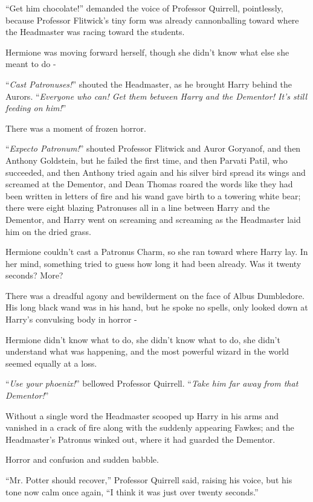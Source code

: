 ``Get him chocolate!'' demanded the voice of Professor Quirrell, pointlessly, because Professor Flitwick's tiny form was already cannonballing toward where the Headmaster was racing toward the students.

Hermione was moving forward herself, though she didn't know what else she meant to do -

``\emph{Cast Patronuses!}'' shouted the Headmaster, as he brought Harry behind the Aurors. ``\emph{Everyone who can! Get them between Harry and the Dementor! It's still feeding on him!}''

There was a moment of frozen horror.

``\emph{Expecto Patronum!}'' shouted Professor Flitwick and Auror Goryanof, and then Anthony Goldstein, but he failed the first time, and then Parvati Patil, who succeeded, and then Anthony tried again and his silver bird spread its wings and screamed at the Dementor, and Dean Thomas roared the words like they had been written in letters of fire and his wand gave birth to a towering white bear; there were eight blazing Patronuses all in a line between Harry and the Dementor, and Harry went on screaming and screaming as the Headmaster laid him on the dried grass.

Hermione couldn't cast a Patronus Charm, so she ran toward where Harry lay. In her mind, something tried to guess how long it had been already. Was it twenty seconds? More?

There was a dreadful agony and bewilderment on the face of Albus Dumbledore. His long black wand was in his hand, but he spoke no spells, only looked down at Harry's convulsing body in horror -

Hermione didn't know what to do, she didn't know what to do, she didn't understand what was happening, and the most powerful wizard in the world seemed equally at a loss.

``\emph{Use your phoenix!}'' bellowed Professor Quirrell. ``\emph{Take him far away from that Dementor!}''

Without a single word the Headmaster scooped up Harry in his arms and vanished in a crack of fire along with the suddenly appearing Fawkes; and the Headmaster's Patronus winked out, where it had guarded the Dementor.

Horror and confusion and sudden babble.

``Mr. Potter should recover,'' Professor Quirrell said, raising his voice, but his tone now calm once again, ``I think it was just over twenty seconds.''

